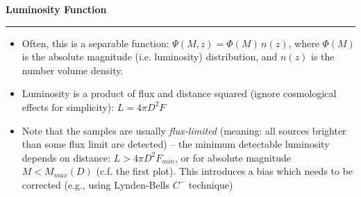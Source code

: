 \documentclass[letterpaper,landscape]{slides}
\begin{document}
\begin{slide}
\begin{center}
\bfseries
{\large {\color{red} Luminosity Function}}
\end{center}
\vskip 0.2in
\hrule


\begin{itemize}
\item
Often, this is a separable function: $\Psi(M,z) = \Phi(M) \, n(z)$, where $\Phi(M)$ is the
absolute magnitude (i.e. luminosity) distribution, and $n(z)$ is the number volume density. 
\item Luminosity is a product of flux and distance squared (ignore cosmological
effects for simplicity): { $L = 4 \pi D^2 F$}
\item
Note that the samples are usually {\it flux-limited} (meaning: all sources brighter than some 
flux limit are detected) -- { the minimum detectable luminosity depends on distance}:
$L > 4 \pi D^2 F_{min}$, or for absolute magnitude $M < M_{max}(D)$ (c.f. the first plot). This introduces a bias which needs to be corrected (e.g., using Lynden-Bells $C^-$ technique)

\end{itemize}

\vfill
\end{slide}
 
\end{document}
